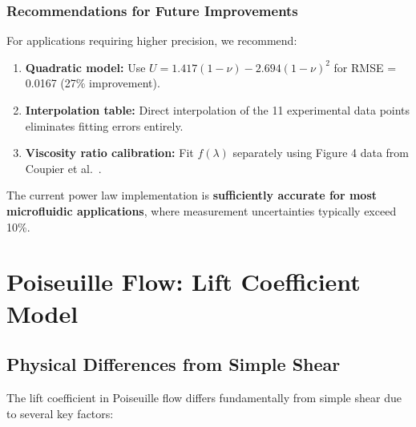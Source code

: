 \documentclass{article}
\begin{document}
\subsubsection{Recommendations for Future Improvements}

For applications requiring higher precision, we recommend:

\begin{enumerate}
    \item \textbf{Quadratic model:} Use $U = 1.417(1-\nu) - 2.694(1-\nu)^2$ for RMSE = 0.0167 (27\% improvement).
    
    \item \textbf{Interpolation table:} Direct interpolation of the 11 experimental data points eliminates fitting errors entirely.
    
    \item \textbf{Viscosity ratio calibration:} Fit $f(\lambda)$ separately using Figure 4 data from Coupier et al.~\cite{coupier2009}.
\end{enumerate}

The current power law implementation is \textbf{sufficiently accurate for most microfluidic applications}, where measurement uncertainties typically exceed 10\%.

\section{Poiseuille Flow: Lift Coefficient Model}
\label{sec:lift_poiseuille}

\subsection{Physical Differences from Simple Shear}

The lift coefficient in Poiseuille flow differs fundamentally from simple shear due to several key factors:
\end{document}
